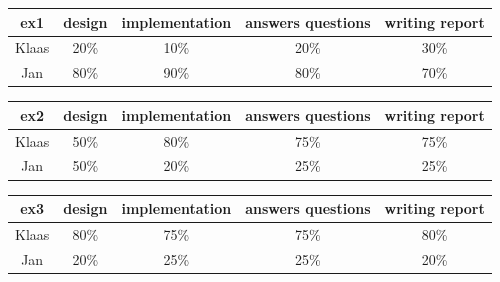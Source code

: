 \documentclass[a4paper]{article}
\begin{document}
\begin{table}[H]
\centering
\begin{tabular}{ccccc}
ex1 & design & implementation & answers questions & writing report \\
\hline
Klaas & 20\% & 10\% & 20\% & 30\% \\
\hline
Jan & 80\% & 90\% & 80\% & 70\% \\
\end{tabular}
\end{table}

\begin{table}[H]
\centering
\begin{tabular}{ccccc}
ex2 & design & implementation & answers questions & writing report \\
\hline
Klaas & 50\% & 80\% & 75\% & 75\% \\
\hline
Jan & 50\% & 20\% & 25\% & 25\% \\
\end{tabular}
\end{table}

\begin{table}[H]
\centering
\begin{tabular}{ccccc}
ex3 & design & implementation & answers questions & writing report \\
\hline
Klaas & 80\% & 75\% & 75\% & 80\% \\
\hline
Jan & 20\% & 25\% & 25\% & 20\% \\
\end{tabular}
\end{table}
\end{document}
